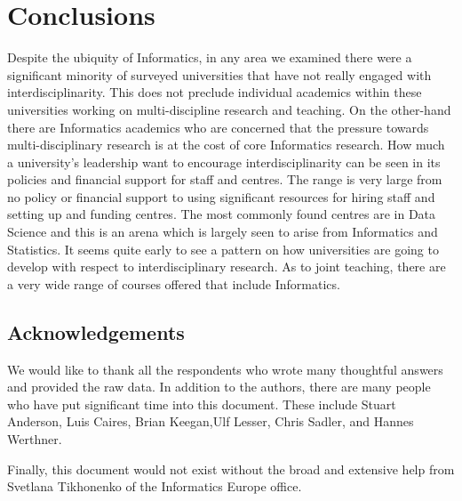 \section{Conclusions}

Despite the ubiquity of Informatics, in any area we examined there were a significant minority of surveyed universities that have not really engaged with interdisciplinarity.  This does not preclude individual academics within these universities working on multi-discipline research and teaching. On the other-hand there are Informatics academics who are concerned that the pressure towards multi-disciplinary research is at the cost of core Informatics research. How much a university's leadership want to encourage interdisciplinarity can be seen in its policies and financial support for staff and centres.  The range is very large from no policy or financial support to using significant resources for hiring staff and setting up and funding centres. The most commonly found centres are in Data Science and this is an arena which is largely seen to arise from Informatics and Statistics. It seems quite early to see a pattern on how universities are going to develop with respect to interdisciplinary research. As to joint teaching, there are a very wide range of courses offered that include Informatics. 

\subsection*{Acknowledgements} We would like to thank all the respondents who wrote many thoughtful answers and provided the raw data. In addition to the authors, there are many people who have put significant time into this document. These include Stuart Anderson, Luis Caires, Brian Keegan,Ulf Lesser, Chris Sadler, and Hannes Werthner.

Finally, this document would not exist without the broad and extensive help from Svetlana Tikhonenko of the Informatics Europe office. 
